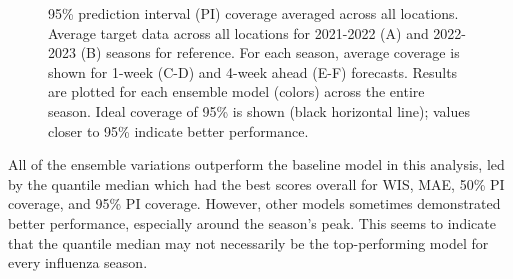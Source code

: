 \documentclass[
  letterpaper,
  DIV=11,
  numbers=noendperiod]{scrartcl}
\begin{document}
\begin{figure}


\caption{\label{fig-cov95-vs-forecast-date}95\% prediction interval (PI)
coverage averaged across all locations. Average target data across all
locations for 2021-2022 (A) and 2022-2023 (B) seasons for reference. For
each season, average coverage is shown for 1-week (C-D) and 4-week ahead
(E-F) forecasts. Results are plotted for each ensemble model (colors)
across the entire season. Ideal coverage of 95\% is shown (black
horizontal line); values closer to 95\% indicate better performance.}

\end{figure}%

All of the ensemble variations outperform the baseline model in this
analysis, led by the quantile median which had the best scores overall
for WIS, MAE, 50\% PI coverage, and 95\% PI coverage. However, other
models sometimes demonstrated better performance, especially around the
season's peak. This seems to indicate that the quantile median may not
necessarily be the top-performing model for every influenza season.
\end{document}
